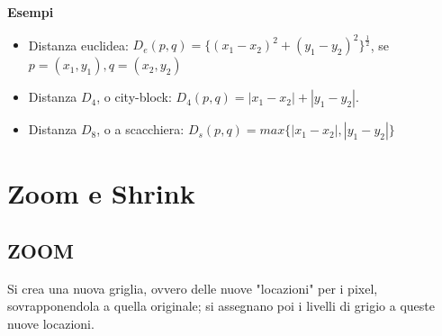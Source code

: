 \textbf{Esempi}

\begin{itemize}
    \item Distanza euclidea: $D_e(p, q) = \{(x_1 - x_2)^2 + (y_1 - y_2)^2\}^{\frac{1}{2}}$, se $p = (x_1, y_1), q=(x_2, y_2)$
    \item Distanza $D_4$, o city-block: $D_4(p, q) = |x_1 - x_2| + |y_1 - y_2|$.
    \item Distanza $D_8$, o a scacchiera: $D_s(p,q) = max\{|x_1 - x_2|, |y_1 - y_2|\}$
\end{itemize}

\section{Zoom e Shrink}
\subsection{ZOOM}

Si crea una nuova griglia, ovvero delle nuove "locazioni" per i pixel,
sovrapponendola a quella originale; si assegnano poi i livelli di grigio a
queste nuove locazioni.

